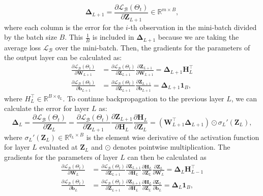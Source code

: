\[\boldsymbol{\Delta}_{L+1} = \frac{\partial \mathcal{L}_\mathcal{B}(\Theta_t)}{\partial \mathbf{Z}_{L+1}} \in \mathbb{R}^{m \times B},\]
where each column is the error for the \(i\)-th observation in the mini-batch divided by the batch size \(B\). This \(\frac{1}{B}\) is included in \(\boldsymbol{\Delta}_{L+1}\) because we are taking the average loss \(\mathcal{L}_\mathcal{B}\) over the mini-batch.
Then, the gradients for the parameters of the output layer can be calculated as:
\[
\begin{aligned}
\frac{\partial \mathcal{L}_\mathcal{B}(\Theta_t)}{\partial \mathbf{W}_{L+1}} &=  \frac{\partial  \mathcal{L}_\mathcal{B}(\Theta_t)}{\partial \mathbf{Z}_{L+1}} \frac{\partial \mathbf{Z}_{L+1}}{\partial \mathbf{W}_{L+1}} = \boldsymbol{\Delta}_{L+1}\mathbf{H}_L^\top\\ 
\frac{\partial \mathcal{L}_\mathcal{B}(\Theta_t)}{\partial \mathbf{b}_{L+1}} &=  \frac{\partial  \mathcal{L}_\mathcal{B}(\Theta_t)}{\partial \mathbf{Z}_{L+1}} \frac{\partial \mathbf{Z}_{L+1}}{\partial \mathbf{b}_{L+1}} = \boldsymbol{\Delta}_{L+1}\mathbf{1}_B,
\end{aligned}
\]
where \(H_L^\top \in \mathbb{R}^{B \times q_L}\). To continue backpropagation to the previous layer \(L\), we can calculate the error for layer \(L\) as:
\[ 
\boldsymbol{\Delta}_L = \frac{\partial \mathcal{L}_\mathcal{B}(\Theta_t)}{\partial \mathbf{Z}_L} = \frac{\partial \mathcal{L}_\mathcal{B}(\Theta_t)}{\partial \mathbf{Z}_{L+1}} \frac{\partial \mathbf{Z}_{L+1}}{\partial \mathbf{H}_L} \frac{\partial \mathbf{H}_L}{\partial \mathbf{Z}_L} = (\mathbf{W}_{L+1}^\top\boldsymbol{\Delta}_{L+1}) \odot \sigma_L'(\mathbf{Z}_L),
\]
where \(\sigma_L'(\mathbf{Z}_L) \in \mathbb{R}^{q_L \times B}\) is the element wise derivative of the activation function for layer \(L\) evaluated at \(\mathbf{Z}_L\) and \(\odot\) denotes pointwise multiplication. The gradients for the parameters of layer \(L\) can then be calculated as
\[
\begin{aligned}
\frac{\partial \mathcal{L}_\mathcal{B}(\Theta_t)}{\partial \mathbf{W}_{L}} &= \frac{\partial \mathcal{L}_\mathcal{B}(\Theta_t)}{\partial \mathbf{Z}_{L+1}} \frac{\partial \mathbf{Z}_{L+1}}{\partial \mathbf{H}_L} \frac{\partial \mathbf{H}_L}{\partial \mathbf{Z}_L}\frac{\partial \mathbf{Z}_L}{\partial \mathbf{W}_L} = \boldsymbol{\Delta}_L\mathbf{H}_{L-1}^\top\\ 
\frac{\partial \mathcal{L}_\mathcal{B}(\Theta_t)}{\partial \mathbf{b}_{L}} &= \frac{\partial \mathcal{L}_\mathcal{B}(\Theta_t)}{\partial \mathbf{Z}_{L+1}} \frac{\partial \mathbf{Z}_{L+1}}{\partial \mathbf{H}_L} \frac{\partial \mathbf{H}_L}{\partial \mathbf{Z}_L} \frac{\partial \mathbf{Z}_L}{\partial \mathbf{b}_L} = \boldsymbol{\Delta}_L\mathbf{1}_B,
\end{aligned}
\]
